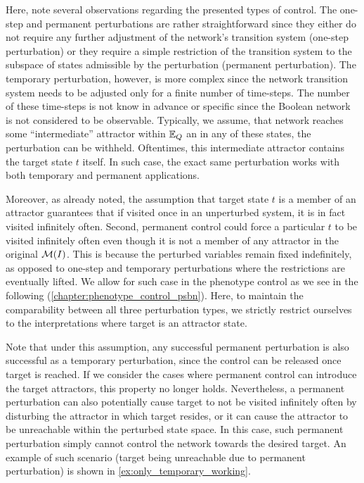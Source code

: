 Here, note several observations regarding the presented types of \PBN{} control. The one-step and permanent perturbations are rather straightforward since they either do not require any further adjustment of the network's transition system (one-step perturbation) or they require a simple restriction of the transition system to the subspace of states admissible by the perturbation (permanent perturbation). The temporary perturbation, however, is more complex since the network transition system needs to be adjusted only for a finite number of time-steps. The number of these time-steps is not know in advance or specific since the Boolean network is not considered to be observable. Typically, we assume, that network reaches some ``intermediate'' attractor within $\mathbb{E}_{Q}$ an in any of these states, the perturbation can be withheld. Oftentimes, this intermediate attractor contains the target state $t$ itself. In such case, the exact same perturbation works with both temporary and permanent applications.

Moreover, as already noted, the assumption that target state $t$ is a member of an attractor guarantees that if visited once in an unperturbed system, it is in fact visited infinitely often. Second, permanent control could force a particular $t$ to be visited infinitely often even though it is not a member of any attractor in the original $\mathcal{M}(I)$. This is because the perturbed variables remain fixed indefinitely, as opposed to one-step and temporary perturbations where the restrictions are eventually lifted. We allow for such case in the phenotype control as we see in the following (\autoref{chapter:phenotype_control_psbn}). Here, to maintain the comparability between all three perturbation types, we strictly restrict ourselves to the interpretations where target is an attractor state.  

Note that under this assumption, any successful permanent perturbation is also successful as a temporary perturbation, since the control can be released once target is reached. If we consider the cases where permanent control can introduce the target attractors, this property no longer holds. Nevertheless, a permanent perturbation can also potentially cause target to not be visited infinitely often by disturbing the attractor in which target resides, or it can cause the attractor to be unreachable within the perturbed state space. In this case, such permanent perturbation simply cannot control the network towards the desired target. An example of such scenario (target being unreachable due to permanent perturbation) is shown in \autoref{ex:only_temporary_working}. 

